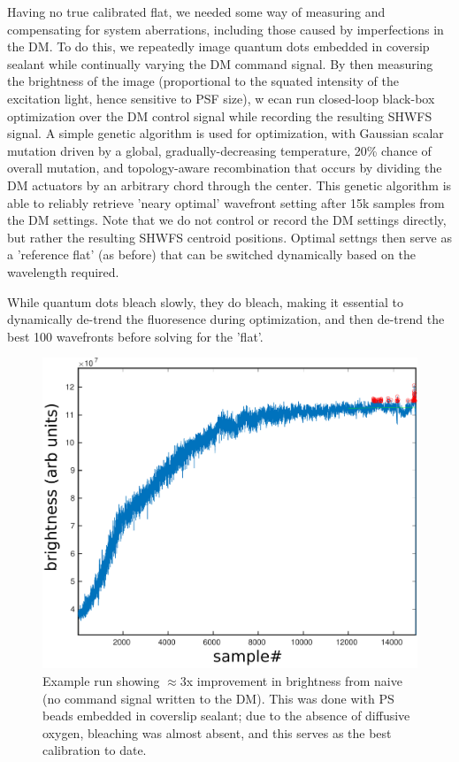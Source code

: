 \documentclass[a4paper,10pt]{article}
\begin{document}
Having no true calibrated flat, we needed some way of measuring and compensating for system aberrations, including those caused by imperfections in the DM.  To do this, we repeatedly image quantum dots embedded in coversip sealant while continually varying the DM command signal.  By then measuring the brightness of the image (proportional to the squated intensity of the excitation light, hence sensitive to PSF size), w ecan run closed-loop black-box optimization over the DM control signal while recording the resulting SHWFS signal.  A simple genetic algorithm is used for optimization, with Gaussian scalar mutation driven by a global, gradually-decreasing temperature, 20\% chance of overall mutation, and topology-aware recombination that occurs by dividing the DM actuators by an arbitrary chord through the center.  This genetic algorithm is able to reliably retrieve 'neary optimal' wavefront setting after 15k samples from the DM settings.  Note that we do not control or record the DM settings directly, but rather the resulting SHWFS centroid positions.  Optimal settngs then serve as a 'reference flat' (as before) that can be switched dynamically based on the wavelength required.  

While quantum dots bleach slowly, they do bleach, making it essential to dynamically de-trend the fluoresence during optimization, and then de-trend the best 100 wavefronts before solving for the 'flat'.

\begin{figure}
\includegraphics[width=\textwidth]{PSbeads_optimization_run.pdf}
\caption{Example run showing $\approx$3x improvement in brightness from naive (no command signal written to the DM).  This was done with PS beads embedded in coverslip sealant; due to the absence of diffusive oxygen, bleaching was almost absent, and this serves as the best calibration to date.}
\end{figure}
\end{document}
